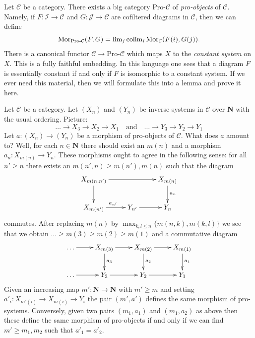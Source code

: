 \begin{remark}
\label{remark-pro-category}
Let $\mathcal{C}$ be a category. There exists a big category
$\text{Pro-}\mathcal{C}$ of {\it pro-objects} of $\mathcal{C}$.
Namely, if $F : \mathcal{I} \to \mathcal{C}$ and
$G : \mathcal{J} \to \mathcal{C}$ are cofiltered diagrams in $\mathcal{C}$,
then we can define
$$
\mathop{\mathrm{Mor}}\nolimits_{\text{Pro-}\mathcal{C}}(F, G) =
\mathop{\mathrm{lim}}\nolimits_j \mathop{\mathrm{colim}}\nolimits_i \mathop{\mathrm{Mor}}\nolimits_\mathcal{C}(F(i), G(j)).
$$
There is a canonical functor $\mathcal{C} \to \text{Pro-}\mathcal{C}$
which maps $X$ to the {\it constant system} on $X$. This is a fully
faithful embedding. In this language one sees that a diagram $F$ is
essentially constant if and only if $F$ is isomorphic to a constant system.
If we ever need this material, then we will formulate this into a lemma
and prove it here.
\end{remark}

\begin{example}
\label{example-pro-morphism-inverse-systems}
Let $\mathcal{C}$ be a category. Let $(X_n)$ and $(Y_n)$ be inverse
systems in $\mathcal{C}$ over $\mathbf{N}$ with the usual ordering.
Picture:
$$
\ldots \to X_3 \to X_2 \to X_1
\quad\text{and}\quad
\ldots \to Y_3 \to Y_2 \to Y_1
$$
Let $a : (X_n) \to (Y_n)$ be a morphism of pro-objects of $\mathcal{C}$.
What does $a$ amount to? Well, for each $n \in \mathbf{N}$ there should
exist an $m(n)$ and a morphism $a_n : X_{m(n)} \to Y_n$. These morphisms
ought to agree in the following sense: for all $n' \geq n$ there exists an
$m(n', n) \geq m(n'), m(n)$ such that the diagram
$$
\xymatrix{
X_{m(n, n')} \ar[rr] \ar[d] & & X_{m(n)} \ar[d]^{a_n} \\
X_{m(n')} \ar[r]^{a_{n'}} & Y_{n'} \ar[r] & Y_n
}
$$
commutes. After replacing $m(n)$ by $\max_{k, l \leq n}\{m(n, k), m(k, l)\}$
we see that we obtain $\ldots \geq m(3) \geq m(2) \geq m(1)$ and a commutative
diagram
$$
\xymatrix{
\ldots \ar[r] &
X_{m(3)} \ar[d]^{a_3} \ar[r] &
X_{m(2)} \ar[d]^{a_2} \ar[r] &
X_{m(1)} \ar[d]^{a_1} \\
\ldots \ar[r] &
Y_3 \ar[r] &
Y_2 \ar[r] &
Y_1
}
$$
Given an increasing map $m' : \mathbf{N} \to \mathbf{N}$ with $m' \geq m$
and setting $a'_i : X_{m'(i)} \to X_{m(i)} \to Y_i$ the pair
$(m', a')$ defines the same morphism of pro-systems. Conversely, given
two pairs $(m_1, a_1)$ and $(m_1, a_2)$ as above then these define the same
morphism of pro-objects if and only if we can find $m' \geq m_1, m_2$
such that $a'_1 = a'_2$.
\end{example}

